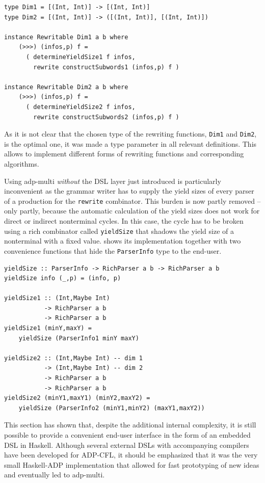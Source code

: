 \documentclass[
    a4paper,
    12pt,
    twoside,
    BCOR=12mm,
    parskip=half,
    chapterprefix,
    numbers=noenddot,
    bibliography=totoc
]{scrbook}
\begin{document}
\begin{lstlisting}[label=lst:rewriteimpl,caption=Rewrite combinator implementations]
type Dim1 = [(Int, Int)] -> [(Int, Int)] 
type Dim2 = [(Int, Int)] -> ([(Int, Int)], [(Int, Int)]) 

instance Rewritable Dim1 a b where
    (>>>) (infos,p) f = 
      ( determineYieldSize1 f infos,
        rewrite constructSubwords1 (infos,p) f )
    
instance Rewritable Dim2 a b where
    (>>>) (infos,p) f = 
      ( determineYieldSize2 f infos,
        rewrite constructSubwords2 (infos,p) f )
\end{lstlisting}

As it is not clear that the chosen type of the rewriting functions, \verb|Dim1| and \verb|Dim2|, is the optimal one, it was made a type parameter in all relevant definitions. This allows to implement different forms of rewriting functions and corresponding algorithms.

Using adp-multi \emph{without} the \gls{DSL} layer just introduced is particularly inconvenient as the grammar writer has to supply the yield sizes of every parser of a production for the \verb|rewrite| combinator. This burden is now partly removed -- only partly, because the automatic calculation of the yield sizes does not work for direct or indirect nonterminal cycles. In this case, the cycle has to be broken using a rich combinator called \verb|yieldSize| that shadows the yield size of a nonterminal with a fixed value.  shows its implementation together with two convenience functions that hide the \verb|ParserInfo| type to the end-user.

\begin{lstlisting}[label=lst:yieldsize,caption=Yield size combinator]
yieldSize :: ParserInfo -> RichParser a b -> RichParser a b
yieldSize info (_,p) = (info, p)

yieldSize1 :: (Int,Maybe Int) 
           -> RichParser a b
           -> RichParser a b
yieldSize1 (minY,maxY) = 
    yieldSize (ParserInfo1 minY maxY)

yieldSize2 :: (Int,Maybe Int) -- dim 1
           -> (Int,Maybe Int) -- dim 2
           -> RichParser a b 
           -> RichParser a b
yieldSize2 (minY1,maxY1) (minY2,maxY2) = 
    yieldSize (ParserInfo2 (minY1,minY2) (maxY1,maxY2))
\end{lstlisting}

This section has shown that, despite the additional internal complexity, it is still possible to provide a convenient end-user interface in the form of an embedded \gls{DSL} in Haskell. Although several external \glspl{DSL} with accompanying compilers have been developed for ADP-CFL, it should be emphasized that it was the very small Haskell-ADP implementation that allowed for fast prototyping of new ideas and eventually led to adp-multi.
  
\end{document}
